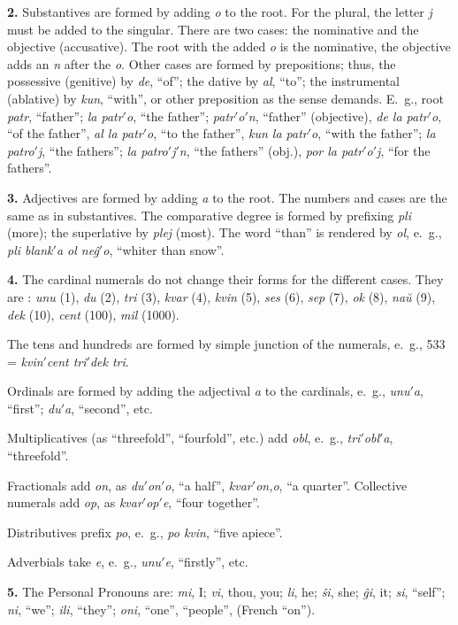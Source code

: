 \textbf{2.} Substantives are formed by adding \emph{o} to the root. For the plural, the letter \emph{j} must be added to the singular. There are two cases: the nominative and the objective (accusative). The root with the added \emph{o} is the nominative, the objective adds an \emph{n} after the \emph{o}. Other cases are formed by prepositions; thus, the possessive (genitive) by \emph{de}, “of”; the dative by \emph{al}, “to”; the instrumental (ablative) by \emph{kun}, “with”, or other preposition as the sense demands. E.~g., root \emph{patr}, “father”; \emph{la patr$'$o}, “the father”; \emph{patr$'$o$'$n}, “father” (objective), \emph{de la patr$'$o}, “of the father”, \emph{al la patr$'$o}, “to the father”, \emph{kun la patr$'$o}, “with the father”; \emph{la patro$'$j}, “the fathers”; \emph{la patro$'$j$'$n}, “the fathers” (obj.), \emph{por la patr$'$o$'$j}, “for the fathers”.

\textbf{3.} Adjectives are formed by adding \emph{a} to the root. The numbers and cases are the same as in substantives. The comparative degree is formed by prefixing \emph{pli} (more); the superlative by \emph{plej} (most). The word “than” is rendered by \emph{ol}, e.~g., \emph{pli blank$'$a ol neĝ$'$o}, “whiter than snow”.

\textbf{4.} The cardinal numerals do not change their forms for the different cases. They are :
\emph{unu} (1), \emph{du} (2), \emph{tri} (3), \emph{kvar} (4), \emph{kvin} (5), \emph{ses} (6), \emph{sep} (7), \emph{ok} (8), \emph{naŭ} (9), \emph{dek} (10), \emph{cent} (100), \emph{mil} (1000).

The tens and hundreds are formed by simple junction of the numerals, e.~g., 533 = \emph{kvin$'$cent tri$'$dek tri}.

Ordinals are formed by adding the adjectival \emph{a} to the cardinals, e.~g., \emph{unu$'$a}, “first”; \emph{du$'$a}, “second”, etc.

Multiplicatives (as “threefold”, “fourfold”, etc.) add \emph{obl}, e.~g., \emph{tri$'$obl$'$a}, “threefold”.

Fractionals add \emph{on}, as \emph{du$'$on$'$o}, “a half”, \emph{kvar$'$on,o}, “a quarter”. Collective numerals add \emph{op}, as \emph{kvar$'$op$'$e}, “four together”.

Distributives prefix \emph{po}, e.~g., \emph{po kvin}, “five apiece”.

Adverbials take \emph{e}, e.~g., \emph{unu$'$e}, “firstly”, etc.

\textbf{5.} The Personal Pronouns are: \emph{mi}, I; \emph{vi}, thou, you; \emph{li}, he; \emph{ŝi}, she; \emph{ĝi}, it; \emph{si}, “self”; \emph{ni}, “we”; \emph{ili}, “they”; \emph{oni}, “one”, “people”, (French “on”).

